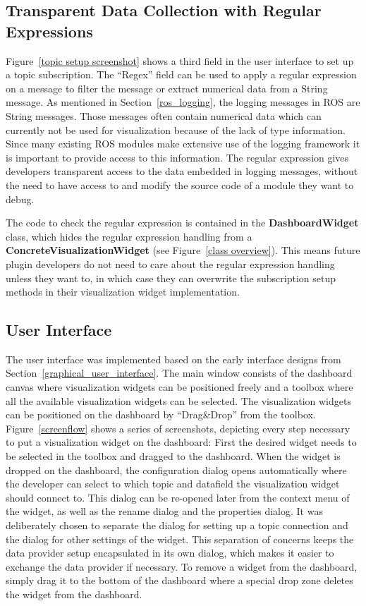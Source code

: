 \subsection{Transparent Data Collection with Regular Expressions}
\label{transparent_collection}

Figure~\ref{topic setup screenshot} shows a third field in the user interface to set up a topic subscription. The ``Regex'' field can be used to apply a regular expression on a message to filter the message or extract numerical data from a String message. As mentioned in Section~\ref{ros_logging}, the logging messages in ROS are String messages. Those messages often contain numerical data which can currently not be used for visualization because of the lack of type information. Since many existing ROS modules make extensive use of the logging framework it is important to provide access to this information. The regular expression gives developers transparent access to the data embedded in logging messages, without the need to have access to and modify the source code of a module they want to debug.

The code to check the regular expression is contained in the \textbf{DashboardWidget} class, which hides the regular expression handling from a \textbf{ConcreteVisualizationWidget} (see Figure~\ref{class overview}). This means future plugin developers do not need to care about the regular expression handling unless they want to, in which case they can overwrite the subscription setup methods in their visualization widget implementation.

\subsection{User Interface}
The user interface was implemented based on the early interface designs from Section~\ref{graphical_user_interface}. The main window consists of the dashboard canvas where visualization widgets can be positioned freely and a toolbox where all the available visualization widgets can be selected. The visualization widgets can be positioned on the dashboard by ``Drag\&Drop'' from the toolbox. Figure~\ref{screenflow} shows a series of screenshots, depicting every step necessary to put a visualization widget on the dashboard: First the desired widget needs to be selected in the toolbox and dragged to the dashboard. When the widget is dropped on the dashboard, the configuration dialog opens automatically where the developer can select to which topic and datafield the visualization widget should connect to. This dialog can be re-opened later from the context menu of the widget, as well as the rename dialog and the properties dialog. It was deliberately chosen to separate the dialog for setting up a topic connection and the dialog for other settings of the widget. This separation of concerns keeps the data provider setup encapsulated in its own dialog, which makes it easier to exchange the data provider if necessary. To remove a widget from the dashboard, simply drag it to the bottom of the dashboard where a special drop zone deletes the widget from the dashboard.

